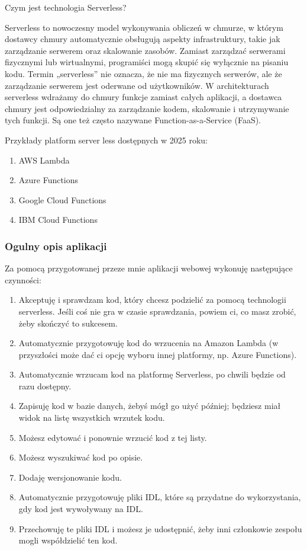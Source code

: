 \documentclass[runningheads,12pt]{llncs}
\begin{document}
Czym jest technologia Serverless?

Serverless to nowoczesny model wykonywania obliczeń w chmurze, w którym dostawcy chmury automatycznie obsługują aspekty infrastruktury, takie jak zarządzanie serwerem oraz skalowanie zasobów. Zamiast zarządzać serwerami fizycznymi lub wirtualnymi, programiści mogą skupić się wyłącznie na pisaniu kodu. Termin „serverless” nie oznacza, że nie ma fizycznych serwerów, ale że zarządzanie serwerem jest oderwane od użytkowników. W architekturach serverless wdrażamy do chmury funkcje zamiast całych aplikacji, a dostawca chmury jest odpowiedzialny za zarządzanie kodem, skalowanie i utrzymywanie tych funkcji. Są one też często nazywane Function-as-a-Service (FaaS).

Przykłady platform server less dostępnych w 2025 roku:

\begin{enumerate}
    \item AWS Lambda 
    \item Azure Functions 
    \item Google Cloud Functions 
    \item IBM Cloud Functions 
\end{enumerate}

\subsubsection{Ogulny opis aplikacji}

Za pomocą przygotowanej przeze mnie aplikacji webowej wykonuję następujące czynności:

\begin{enumerate}
    \item Akceptuję i sprawdzam kod, który chcesz podzielić za pomocą technologii serverless. Jeśli coś nie gra w czasie sprawdzania, powiem ci, co masz zrobić, żeby skończyć to sukcesem.
    \item Automatycznie przygotowuję kod do wrzucenia na Amazon Lambda (w przyszłości może dać ci opcję wyboru innej platformy, np. Azure Functions).
    \item Automatycznie wrzucam kod na platformę Serverless, po chwili będzie od razu dostępny.
    \item Zapisuję kod w bazie danych, żebyś mógł go użyć później; będziesz miał widok na listę wszystkich wrzutek kodu.
    \item Możesz edytować i ponownie wrzucić kod z tej listy.
    \item Możesz wyszukiwać kod po opisie.
    \item Dodaję wersjonowanie kodu.
    \item Automatycznie przygotowuję pliki IDL, które są przydatne do wykorzystania, gdy kod jest wywoływany na IDL.
    \item Przechowuję te pliki IDL i możesz je udostępnić, żeby inni członkowie zespołu mogli współdzielić ten kod.
\end{enumerate}
\end{document}
